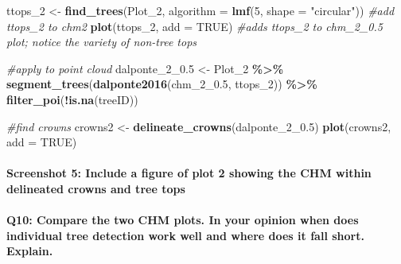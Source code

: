 \documentclass[
]{book}
\newenvironment{Shaded}{\begin{snugshade}}{\end{snugshade}}
\newcommand{\AttributeTok}[1]{\textcolor[rgb]{0.13,0.29,0.53}{#1}}
\newcommand{\CommentTok}[1]{\textcolor[rgb]{0.56,0.35,0.01}{\textit{#1}}}
\newcommand{\ConstantTok}[1]{\textcolor[rgb]{0.56,0.35,0.01}{#1}}
\newcommand{\DecValTok}[1]{\textcolor[rgb]{0.00,0.00,0.81}{#1}}
\newcommand{\FloatTok}[1]{\textcolor[rgb]{0.00,0.00,0.81}{#1}}
\newcommand{\FunctionTok}[1]{\textcolor[rgb]{0.13,0.29,0.53}{\textbf{#1}}}
\newcommand{\NormalTok}[1]{#1}
\newcommand{\OtherTok}[1]{\textcolor[rgb]{0.56,0.35,0.01}{#1}}
\newcommand{\SpecialCharTok}[1]{\textcolor[rgb]{0.81,0.36,0.00}{\textbf{#1}}}
\newcommand{\StringTok}[1]{\textcolor[rgb]{0.31,0.60,0.02}{#1}}
\begin{document}
\begin{Shaded}
\begin{Highlighting}[]
\NormalTok{ttops\_2 }\OtherTok{\textless{}{-}} \FunctionTok{find\_trees}\NormalTok{(Plot\_2, }\AttributeTok{algorithm =} \FunctionTok{lmf}\NormalTok{(}\DecValTok{5}\NormalTok{, }\AttributeTok{shape =} \StringTok{"circular"}\NormalTok{))}
\CommentTok{\#add ttops\_2 to chm2}
\FunctionTok{plot}\NormalTok{(ttops\_2, }\AttributeTok{add =} \ConstantTok{TRUE}\NormalTok{) }\CommentTok{\#adds ttops\_2 to chm\_2\_0.5 plot; notice the variety of non{-}tree tops}

\CommentTok{\#apply to point cloud}
\NormalTok{dalponte\_2\_0}\FloatTok{.5} \OtherTok{\textless{}{-}}\NormalTok{ Plot\_2 }\SpecialCharTok{\%\textgreater{}\%} 
  \FunctionTok{segment\_trees}\NormalTok{(}\FunctionTok{dalponte2016}\NormalTok{(chm\_2\_0}\FloatTok{.5}\NormalTok{, ttops\_2)) }\SpecialCharTok{\%\textgreater{}\%} 
  \FunctionTok{filter\_poi}\NormalTok{(}\SpecialCharTok{!}\FunctionTok{is.na}\NormalTok{(treeID))}


\CommentTok{\#find crowns}
\NormalTok{crowns2 }\OtherTok{\textless{}{-}} \FunctionTok{delineate\_crowns}\NormalTok{(dalponte\_2\_0}\FloatTok{.5}\NormalTok{)}
\FunctionTok{plot}\NormalTok{(crowns2, }\AttributeTok{add =} \ConstantTok{TRUE}\NormalTok{)}
\end{Highlighting}
\end{Shaded}

\hypertarget{screenshot-5-include-a-figure-of-plot-2-showing-the-chm-within-delineated-crowns-and-tree-tops}{%
\paragraph*{Screenshot 5: Include a figure of plot 2 showing the CHM within delineated crowns and tree tops}\label{screenshot-5-include-a-figure-of-plot-2-showing-the-chm-within-delineated-crowns-and-tree-tops}}

\hypertarget{q10-compare-the-two-chm-plots.-in-your-opinion-when-does-individual-tree-detection-work-well-and-where-does-it-fall-short.-explain.}{%
\paragraph*{Q10: Compare the two CHM plots. In your opinion when does individual tree detection work well and where does it fall short. Explain.}\label{q10-compare-the-two-chm-plots.-in-your-opinion-when-does-individual-tree-detection-work-well-and-where-does-it-fall-short.-explain.}}
\end{document}
